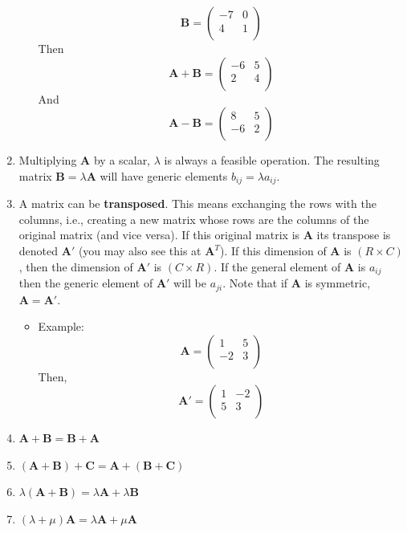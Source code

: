 \documentclass[11pt]{article}
\theoremstyle{definition}
\theoremstyle{remark}
\begin{document}
\begin{enumerate}
\begin{itemize}
$$
\textbf{B} =
\begin{pmatrix}
-7&0\\
4&1\\
\end{pmatrix}
$$
Then 
$$
\textbf{A} + \textbf{B} =
\begin{pmatrix}
-6&5\\
2&4\\
\end{pmatrix}
$$
And
$$
\textbf{A} - \textbf{B} =
\begin{pmatrix}
8&5\\
-6&2\\
\end{pmatrix}
$$
\end{itemize}
\item Multiplying \textbf{A} by a scalar, $\lambda$ is always a feasible operation. The resulting matrix $\mathbf{B} = \lambda\mathbf{A}$ will have generic elements $b_{ij} = \lambda a_{ij}$.
\item A matrix can be \textbf{transposed}. This means exchanging the rows with the columns, i.e., creating a new matrix whose rows are the columns of the original matrix (and vice versa). If this original matrix is $\mathbf{A}$ its transpose is denoted $\mathbf{A'}$ (you may also see this at $\mathbf{A}^T$). If this dimension of \textbf{A} is $(R \times C)$, then the dimension of $\mathbf{A'}$ is $(C \times R)$. If the general element of \textbf{A} is $a_{ij}$ then the generic element of $\mathbf{A'}$ will be $a_{ji}$. Note that if $\mathbf{A}$ is symmetric, $\mathbf{A}=\mathbf{A'}$.
\begin{itemize}
\item Example: 
$$
\textbf{A} =
\begin{pmatrix}
1&5\\
-2&3\\
\end{pmatrix}
$$
Then,
$$
\mathbf{A}' =
\begin{pmatrix}
1&-2\\
5&3\\
\end{pmatrix}
$$
\end{itemize}
\item $\mathbf{A} + \mathbf{B} =  \mathbf{B} + \mathbf{A}$ 
\item $(\mathbf{A} + \mathbf{B}) + \mathbf{C} =  \mathbf{A}+ (\mathbf{B} + \mathbf{C})$ 
\item $\lambda(\mathbf{A} + \mathbf{B}) =  \lambda \mathbf{A} + \lambda \mathbf{B}$ 
\item $(\lambda + \mu)\mathbf{A}  =  \lambda \mathbf{A} + \mu \mathbf{A}$ 
\end{enumerate}
\end{document}
